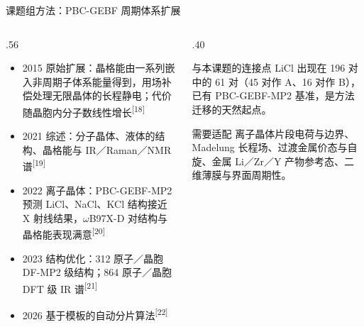 \documentclass[aspectratio=169,10pt]{beamer}
\renewcommand{\cite}[1]{\textsuperscript{\color{NJUMuted}[#1]}}
\begin{document}
\begin{frame}[t]{课题组方法：PBC-GEBF 周期体系扩展}
\begin{columns}[T,onlytextwidth]
  \begin{column}{.56\textwidth}
    \begin{itemize}
      \item \alert{2015 原始扩展}：晶格能由一系列嵌入非周期子体系能量得到，用\alert{场补偿}处理无限晶体的长程静电；代价随晶胞内分子数线性增长\cite{18}
      \item 2021 综述：分子晶体、液体的结构、晶格能与 IR／Raman／NMR 谱\cite{19}
      \item \alert{2022 离子晶体}：PBC-GEBF-MP2 预测 \alert{LiCl}、NaCl、KCl 结构接近 X 射线结果，$\omega$B97X-D 对结构与晶格能表现满意\cite{20}
      \item 2023 结构优化：312 原子／晶胞 DF-MP2 级结构；864 原子／晶胞 DFT 级 IR 谱\cite{21}
      \item 2026 基于模板的自动分片算法\cite{22}
    \end{itemize}
  \end{column}
  \begin{column}{.40\textwidth}
    \begin{njuquotegold}{与本课题的连接点}
      LiCl 出现在 196 对中的 61 对（45 对作 A、16 对作 B），已有 PBC-GEBF-MP2 基准，是方法迁移的天然起点。
    \end{njuquotegold}
    \begin{njuquotered}{需要适配}
      离子晶体片段电荷与边界、Madelung 长程场、过渡金属价态与自旋、金属 Li／Zr／Y 产物参考态、二维薄膜与界面周期性。
    \end{njuquotered}
  \end{column}
\end{columns}
\end{frame}
\end{document}

